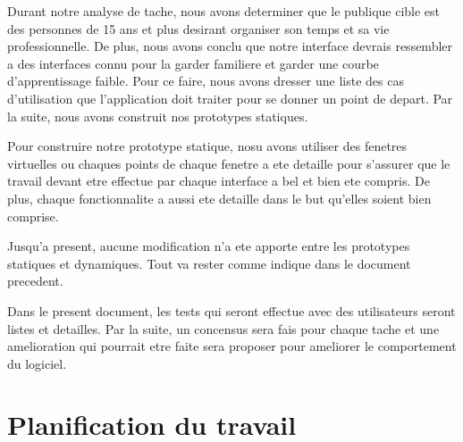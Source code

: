 \documentclass[letterpaper, oneside, 12pt, these, creativecommons]{thETS}
\begin{document}
Durant notre analyse de tache, nous avons determiner que le publique cible est des personnes de 15 ans et plus desirant organiser son temps et sa vie professionnelle. De plus, nous avons conclu que notre interface devrais ressembler a des interfaces connu pour la garder familiere et garder une courbe d'apprentissage faible. Pour ce faire, nous avons dresser une liste des cas d'utilisation que l'application doit traiter pour se donner un point de depart. Par la suite, nous avons construit nos prototypes statiques.

Pour construire notre prototype statique, nosu avons utiliser des fenetres virtuelles ou chaques points de chaque fenetre a ete detaille pour s'assurer que le travail devant etre effectue par chaque interface a bel et bien ete compris. De plus, chaque fonctionnalite a aussi ete detaille dans le but qu'elles soient bien comprise.

Jusqu'a present, aucune modification n'a ete apporte entre les prototypes statiques et dynamiques. Tout va rester comme indique dans le document precedent.

Dans le present document, les tests qui seront effectue avec des utilisateurs seront listes et detailles. Par la suite, un concensus sera fais pour chaque tache et une amelioration qui pourrait etre faite sera proposer pour ameliorer le comportement du logiciel.

\chapter{Planification du travail}
\end{document}
